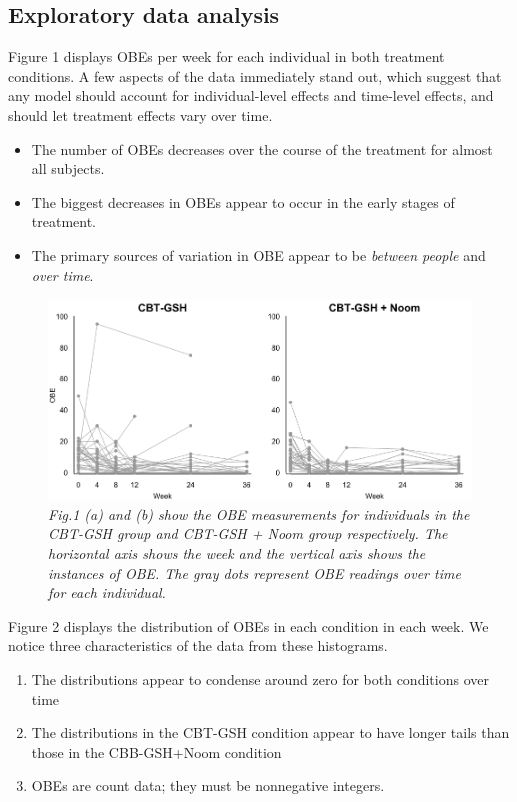 \documentclass{article}
\begin{document}
\subsection*{Exploratory data analysis}
Figure 1 displays OBEs per week for each individual in both treatment conditions.  A few aspects of the data immediately stand out, which suggest that any model should account for individual-level effects and time-level effects, and should let treatment effects vary over time.  
\begin{itemize}
\item{The number of OBEs decreases over the course of the treatment for almost all subjects.}
\item{The biggest decreases in OBEs appear to occur in the early stages of treatment.}
\item{The primary sources of variation in OBE appear to be \emph{between people} and \emph{over time}.}
\end{itemize}
%
\begin{figure}[H]
   \begin{center}
\includegraphics[width=\textwidth, height=\textheight, keepaspectratio]{Noom_paths.png}
   \end{center}
\caption{\emph{Fig.1 (a) and (b) show the OBE measurements for individuals in the CBT-GSH group and CBT-GSH + Noom group respectively. The horizontal axis shows the week and the vertical axis shows the instances of OBE. The gray dots represent OBE readings over time for each individual. }}
\end{figure}
%
Figure 2 displays the distribution of OBEs in each condition in each week.  We notice three characteristics of the data from these histograms.
\begin{enumerate}
\item{The distributions appear to condense around zero for both conditions over time} 
\item{The distributions in the CBT-GSH condition appear to have longer tails than those in the CBB-GSH+Noom condition}
\item{OBEs are count data; they must be nonnegative integers.}
\end{enumerate}
\end{document}
